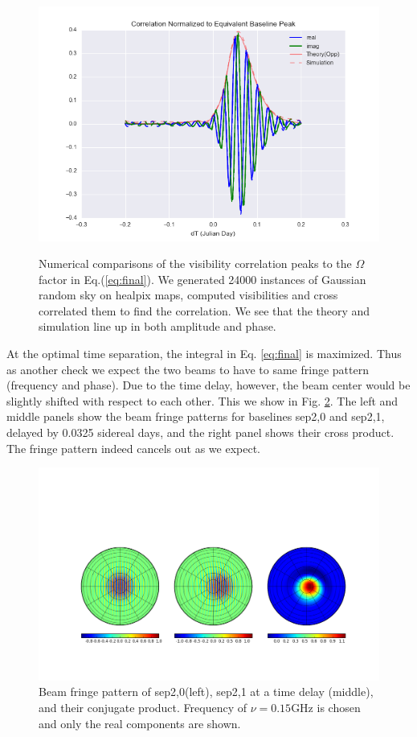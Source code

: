 \documentclass[preprint2,numberedappendix,tighten,twocolappendix]{aastex6}  %
\renewcommand\[{\begin{equation}}
\renewcommand\]{\end{equation}}
\begin{document}
\begin{figure}[H]
\includegraphics[width=\linewidth]{redun_agree}
\label{fig:numerics}
\caption{Numerical comparisons of the visibility correlation peaks to the $\Omega$ factor in Eq.(\ref{eq:final}). We generated 24000 instances of Gaussian random sky on healpix maps, computed visibilities and cross correlated them to find the correlation.  We see that the theory and simulation line up in both amplitude and phase. }
\end{figure}


At the optimal time separation, the integral in Eq. \eqref{eq:final}
is maximized. Thus as another check we expect the two beams to have to same fringe pattern
(frequency and phase). Due to the time delay, however, the beam center
would be slightly shifted with respect to each other. This we show
in Fig. \ref{fig:Beam-fringe-pattern}. The left and middle panels show the beam fringe
patterns for baselines sep2,0 and sep2,1, delayed by 0.0325 sidereal days,
and the right panel shows their cross product. The fringe pattern
indeed cancels out as we expect. 

\begin{widetext}
\begin{figure}[H]
\includegraphics[scale=0.5]{fringe_res}

\caption{Beam fringe pattern of sep2,0(left), sep2,1 at a time delay (middle),
and their conjugate product. Frequency of $\nu=0.15\text{GHz}$ is
chosen and only the real components are shown. \label{fig:Beam-fringe-pattern}}
\end{figure}
\end{widetext}
\end{document}
